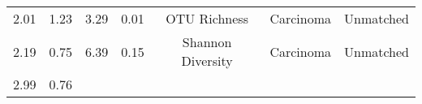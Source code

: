 \documentclass[12pt,]{article}
\begin{document}
\begin{longtable}[]{@{}ccccccc@{}}
\begin{minipage}[t]{0.09\columnwidth}
2.01\strut
\end{minipage} & \begin{minipage}[t]{0.16\columnwidth}\centering\strut
1.23\strut
\end{minipage} & \begin{minipage}[t]{0.16\columnwidth}\centering\strut
3.29\strut
\end{minipage} & \begin{minipage}[t]{0.07\columnwidth}\centering\strut
0.01\strut
\end{minipage} & \begin{minipage}[t]{0.14\columnwidth}\centering\strut
OTU Richness\strut
\end{minipage} & \begin{minipage}[t]{0.09\columnwidth}\centering\strut
Carcinoma\strut
\end{minipage} & \begin{minipage}[t]{0.11\columnwidth}\centering\strut
Unmatched\strut
\end{minipage}\tabularnewline
\begin{minipage}[t]{0.09\columnwidth}\centering\strut
2.19\strut
\end{minipage} & \begin{minipage}[t]{0.16\columnwidth}\centering\strut
0.75\strut
\end{minipage} & \begin{minipage}[t]{0.16\columnwidth}\centering\strut
6.39\strut
\end{minipage} & \begin{minipage}[t]{0.07\columnwidth}\centering\strut
0.15\strut
\end{minipage} & \begin{minipage}[t]{0.14\columnwidth}\centering\strut
Shannon Diversity\strut
\end{minipage} & \begin{minipage}[t]{0.09\columnwidth}\centering\strut
Carcinoma\strut
\end{minipage} & \begin{minipage}[t]{0.11\columnwidth}\centering\strut
Unmatched\strut
\end{minipage}\tabularnewline
\begin{minipage}[t]{0.09\columnwidth}\centering\strut
2.99\strut
\end{minipage} & \begin{minipage}[t]{0.16\columnwidth}\centering\strut
0.76\strut
\end{minipage} & \begin{minipage}[t]{0.16\columnwidth}\centering\strut

\end{minipage}
\end{longtable}
\end{document}
